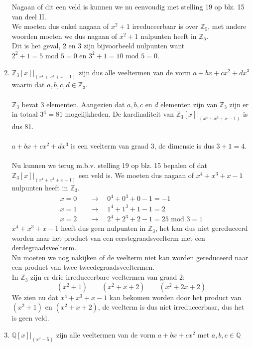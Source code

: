 \documentclass[11pt,a4paper,titlepage]{article}
\begin{document}
\begin{enumerate}[label=(\alph*)]
		Nagaan of dit een veld is kunnen we nu eenvoudig met stelling 19 op blz. 15 van deel II.\\ 
		We moeten dus enkel nagaan of $x^2+1$ irreduceerbaar is over $\mathbb{Z}_5$, met andere woorden moeten we dus nagaan of $x^2+1$ nulpunten heeft in $\mathbb{Z}_5$.\\
		Dit is het geval, 2 en 3 zijn bijvoorbeeld nulpunten want $2^2 + 1 = 5 \text{ mod } 5 = 0$ en $3^2 + 1 = 10 \text{ mod } 5 = 0$.
	\item $\mathbb{Z}_3[x]|_{(x^4+x^3+x-1)}$ zijn dus alle veeltermen van de vorm $a + bx + cx^2 + dx^3$ waarin dat $a,b,c,d \in \mathbb{Z}_3$. \\ \\
		$\mathbb{Z}_3$ bevat 3 elementen. Aangezien dat $a,b,c$ en $d$ elementen zijn van $\mathbb{Z}_3$ zijn er in totaal $3^4 = 81$ mogelijkheden. De kardinaliteit van $\mathbb{Z}_3[x]|_{(x^4+x^3+x-1)}$ is dus 81. \\ \\
		 $a + bx + cx^2 + dx^3$ is een veelterm van graad 3, de dimensie is dus $3+1 = 4$.\\ \\
		Nu kunnen we terug m.b.v. stelling 19 op blz. 15 bepalen of dat $\mathbb{Z}_3[x]|_{(x^4+x^3+x-1)}$ een veld is. We moeten dus nagaan of $x^4+x^3+x-1$ nulpunten heeft in $\mathbb{Z}_3$.
		\begin{align*}
			x = 0 \quad &\rightarrow \quad 0^4+0^3+0-1 = -1\\
			x = 1 \quad &\rightarrow \quad 1^4 + 1^3 + 1 -1 = 2\\
			x = 2 \quad &\rightarrow \quad 2^4 + 2^3 + 2 -1 = 25 \text{ mod } 3 = 1
		\end{align*}
		$x^4+x^3+x-1$ heeft dus geen nulpunten in $\mathbb{Z}_3$, het kan dus niet gereduceerd worden naar het product van een eerstegraadsveelterm met een derdegraadsveelterm.\\
		Nu moeten we nog nakijken of de veelterm niet kan worden gereduceerd naar een product van twee tweedegraadsveeltermen. \\
		In $\mathbb{Z}_3$ zijn er drie irreduceerbare veeltermen van graad 2:
			$$(x^2 + 1) \quad \quad (x^2+x+2) \quad \quad (x^2+2x+2)$$
		We zien nu dat $x^4+x^3+x-1$ kan bekomen worden door het product van $(x^2 + 1)$ en $(x^2+x+2)$, de veelterm is dus niet irreduceerbaar, dus het is geen veld.
	\item $\mathbb{Q}[x]|_{(x^3-5)}$ zijn alle veeltermen van de vorm $a + bx + cx^2$ met $a,b,c \in \mathbb{Q}$ \\ \\

\end{enumerate}
\end{document}

